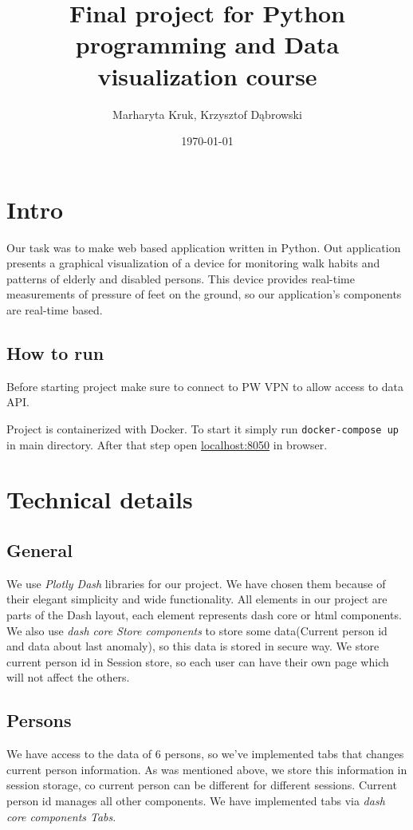 \documentclass{article}
\title{Final project for Python programming and Data visualization course}
\author{Marharyta Kruk, Krzysztof Dąbrowski}
\date{\today}
\begin{document}
\maketitle
\tableofcontents
\newpage

\section{Intro}
Our task was to make web based application written in Python. Out application presents a graphical visualization of a device for monitoring walk habits and patterns of elderly and disabled persons.
\newline
This device provides real-time measurements of pressure of feet on the ground, so our application's components are real-time based.
\subsection{How to run}
Before starting project make sure to connect to PW VPN to allow access to data API.

Project is containerized with Docker. To start it simply run \texttt{docker-compose up} in main directory. After that step open \href{http://localhost:8050}{localhost:8050} in browser.

\section{Technical details}
\subsection{General}
We use \textit{Plotly Dash} libraries for our project. We have chosen them because of their elegant simplicity and wide functionality. All elements in our project are parts of the Dash layout, each element represents dash core or html components. We also use \textit{dash core Store components} to store some data(Current person id and data about last anomaly), so this data is stored in secure way. We store current person id in Session store, so each user can have their own page which will not affect the others.
\subsection{Persons}
We have access to the data of 6 persons, so we've implemented tabs that changes current person information. As was mentioned above, we store this information in session storage, co current person can be different for different sessions. Current person id manages all other components. We have implemented tabs via \textit{dash core components Tabs}.
\end{document}
